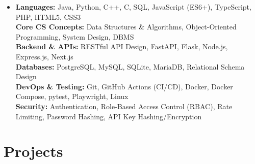 \documentclass[letterpaper,10pt]{article}
\begin{document}
\begin{itemize}[
leftmargin=0.13in,
label={},
itemsep=1pt,
topsep=0pt,
parsep=0pt,
partopsep=0pt
]

\item{
\textbf{Languages:} Java, Python, C++, C, SQL, JavaScript (ES6+), TypeScript, PHP, HTML5, CSS3 \\[2pt]
\textbf{Core CS Concepts:} Data Structures \& Algorithms, Object-Oriented Programming, System Design, DBMS \\[2pt]
\textbf{Backend \& APIs:} RESTful API Design, FastAPI, Flask, Node.js, Express.js, Next.js \\[2pt]
\textbf{Databases:} PostgreSQL, MySQL, SQLite, MariaDB, Relational Schema Design \\[2pt]
\textbf{DevOps \& Testing:} Git, GitHub Actions (CI/CD), Docker, Docker Compose, pytest, Playwright, Linux \\[2pt]
\textbf{Security:} Authentication, Role-Based Access Control (RBAC), Rate Limiting, Password Hashing, API Key Hashing/Encryption
}

\end{itemize}
\vspace{-5pt}

\section{Projects}
\end{document}
